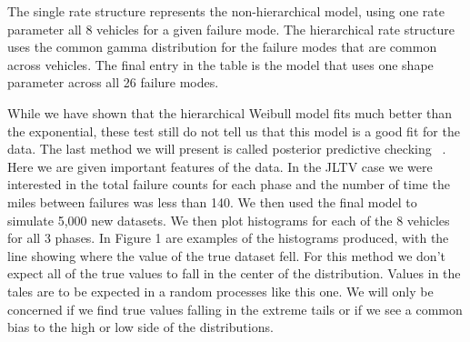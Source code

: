 \documentclass[12pt]{article}
\begin{document}
The single rate structure represents the non-hierarchical model, using one rate
parameter all 8 vehicles for a given failure mode.  The hierarchical rate
structure uses the common gamma distribution for the failure modes that are
common across vehicles.  The final entry in the table is the model that uses one
shape parameter across all 26 failure modes.

While we have shown that the hierarchical Weibull model fits much better than
the exponential, these test still do not tell us that this model is a good fit
for the data.  The last method we will present is called posterior predictive
checking ~\cite{ref3}.  Here we are given important features of the data.
In the JLTV case we were interested in the total failure counts for each phase
and the number of time the miles between failures was less than 140.  We then
used the final model to simulate 5,000 new datasets.  We then plot histograms
for each of the 8 vehicles for all 3 phases.  In Figure 1 are examples of the
histograms produced, with the line showing where the value of the true dataset
fell.  For this method we don’t expect all of the true values to fall in the
center of the distribution.  Values in the tales are to be expected in a random
processes like this one.  We will only be concerned if we find true values
falling in the extreme tails or if we see a common bias to the high or low side
of the distributions.
\end{document}
